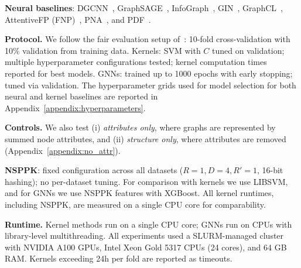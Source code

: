 \textbf{Neural baselines}: DGCNN~\citep{zhang2018endtoend}, GraphSAGE~\citep{hamilton2017graphsage}, InfoGraph~\citep{sun2019infograph}, GIN~\citep{xu2019powerful}, GraphCL~\citep{you2020graph}, AttentiveFP (FNP)~\citep{gasteiger2020directional}, PNA~\citep{corso2020pna}, and PDF~\citep{yang2023bettergraphrepresentationlearning}.

\textbf{Protocol.}
We follow the fair evaluation setup of~\citep{errica2020fair}: 10-fold cross-validation with 10\% validation from training data.
Kernels: SVM with $C$ tuned on validation; multiple hyperparameter configurations tested; kernel computation times reported for best models.
GNNs: trained up to 1000 epochs with early stopping; tuned via validation.
The hyperparameter grids used for model selection for both neural and kernel baselines are reported in Appendix~\ref{appendix:hyperparameters}.

\textbf{Controls.}
We also test (i) \emph{attributes only}, where graphs are represented by summed node attributes, and (ii) \emph{structure only}, where attributes are removed (Appendix~\ref{appendix:no_attr}).

 \textbf{NSPPK}: fixed configuration across all datasets ($R{=}1,D{=}4,R'{=}1$, 16-bit hashing); no per-dataset tuning.
For comparison with kernels we use LIBSVM, and for GNNs we use NSPPK features with XGBoost.
All kernel runtimes, including NSPPK, are measured on a single CPU core for comparability.

\textbf{Runtime.}
Kernel methods run on a single CPU core; GNNs run on CPUs with library-level multithreading. All experiments used a SLURM-managed cluster with NVIDIA A100 GPUs, Intel Xeon Gold 5317 CPUs (24 cores), and 64 GB RAM. Kernels exceeding 24h per fold are reported as timeouts.




